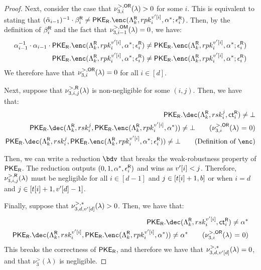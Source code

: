 \begin{proof}
	Next, consider the case that $\nu_{3, i}^{>, \mathsf{OR}}(\lambda) > 0$ for some $i$.
	This is equivalent to stating that $(\tilde{\otpk}_{i - 1})^{-1}\cdot \otpct_i^{\rev} \neq \pker.\enc(\pkerpp, \revpk_i^{\uval'[i]}, \otpk^*; \rer_i)$.
	Then, by the definition of $\beta^{{{\mathsf{R}}}}_i$ and the fact that $\nu_{3, i - 1}^{>, \mathsf{OM}}(\lambda) = 0$, we have:
	\begin{align*}
		\otpk_{i - 1}^{-1} \cdot  \otpk_{i - 1}\cdot \pker.\enc(\pkerpp, \revpk_i^{\uval'[i]}, \otpk^*; \rer_i) & \neq
		\pker.\enc(\pkerpp, \revpk_i^{\uval'[i]}, \otpk^*; \rer_i)                                                                                                                \\
		\pker.\enc(\pkerpp, \revpk_i^{\uval'[i]}, \otpk^*; \rer_i)                                              & \neq \pker.\enc(\pkerpp, \revpk_i^{\uval'[i]}, \otpk^*; \rer_i)
	\end{align*}
	We therefore have that $\nu_{3, i}^{>, \mathsf{OR}}(\lambda) = 0$ for all $i \in [d]$.

	Next, suppose that $\nu_{3, i, j}^{>, \mathsf{{{\mathsf{R}}}}}(\lambda)$ is non-negligible for some $(i, j)$.
	Then, we have that:
	\begin{align*}
		\pker.\dec(\pkerpp, \revsk_i^j, \revct_i) \neq \bot                                                                              \\
		\pker.\dec(\pkerpp, \revsk_i^j, \pker.\enc(\pkerpp, \revpk_i^{\uval'[i]}, \otpk^*)) \neq \bot \tag{\badprobotpR{i} = 0}          \\
		\pker.\dec(\pkerpp, \revsk_i^j, \pker.\enc(\pkerpp, \revpk_i^{\uval'[i]}, \otpk^*; \rer_i)) \neq \bot \tag{Definition of $\enc$} \\
	\end{align*}

	Then, we can write a reduction $\bdv$ that breaks the weak-robustness property of ${{\mathsf{PKE}_{{\mathsf{R}}}}}$.
	The reduction outputs $(0, 1, \alpha^*, \epsilon^{{{\mathsf{R}}}}_i)$ and wins as $v'[i] < j$.
	Therefore, $\nu_{3, i, j}^{>, \mathsf{{{\mathsf{R}}}}}(\lambda)$ must be negligible for all $i \in [d - 1]$ and $j \in [t[i] + 1, b]$ or when $i = d$ and $j \in [t[i] + 1, v'[d] - 1]$.

	Finally, suppose that $\nu_{3, d, v'[d]}^{>, \mathsf{*}}(\lambda){} > 0$.
	Then, we have that:
	\begin{align*}
		\pker.\dec(\pkerpp, \revsk_i^{\uval'[i]}, \revct_i) \neq \otpk^*                                                                     \\
		\pker.\dec(\pkerpp, \revsk_i^{\uval'[i]}, \pker.\enc(\pkerpp, \revpk_i^{\uval'[i]}, \otpk^*)) \neq \otpk^* \tag{\badprobotpR{i} = 0} \\
	\end{align*}
	This breaks the correctness of ${{\mathsf{PKE}_{{\mathsf{R}}}}}$, and therefore we have that $\nu_{3, d, v'[d]}^{>, \mathsf{*}}(\lambda){} = 0$, and that
	$\nu_3^{>}(\lambda)$ is negligible.


\end{proof}
